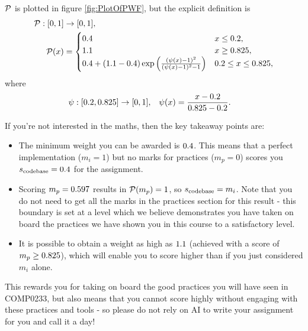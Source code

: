 $\mathcal{P}$ is plotted in figure \ref{fig:PlotOfPWF}, but the explicit definition is
\begin{align*} \label{eq:PWFEqn}
  \mathcal{P} : \left[0, 1\right] & \rightarrow [0,1], \\
  \mathcal{P}(x)                  & =
  \begin{cases}
    0.4                                                                                                               & x \leq 0.2,                        \\
    1.1                                                                                                               & x \geq 0.825,                        \\
    0.4 + \left(1.1 - 0.4\right) \mathrm{exp}\left( \frac{(\psi(x) - 1)^2}{(\psi(x) - 1)^2 - 1} \right) & 0.2 \leq x \leq 0.825,
  \end{cases}
\end{align*}
where
\begin{align*}
  \psi:\left[0.2, 0.825\right] \rightarrow [0,1], & \quad \psi(x) = \frac{x - 0.2}{0.825 - 0.2}.
\end{align*}

If you're not interested in the maths, then the key takeaway points are:
\begin{itemize}
  \item The minimum weight you can be awarded is $0.4$.
        This means that a perfect implementation ($m_i = 1$) but no marks for practices ($m_p = 0$) scores you $s_{\mathrm{codebase}} = 0.4$ for the assignment.
  \item Scoring $m_p = 0.597$ results in $\mathcal{P}(m_p) = 1$, so $s_{\mathrm{codebase}} = m_i$.
        Note that you do not need to get all the marks in the practices section for this result - this boundary is set at a level which we believe demonstrates you have taken on board the practices we have shown you in this course to a satisfactory level.
  \item It is possible to obtain a weight as high as $1.1$ (achieved with a score of $m_p\geq0.825$), which will enable you to score higher than if you just considered $m_i$ alone.
\end{itemize}

This rewards you for taking on board the good practices you will have seen in COMP0233, but also means that you cannot score highly without engaging with these practices and tools - so please do not rely on AI to write your assignment for you and call it a day!

